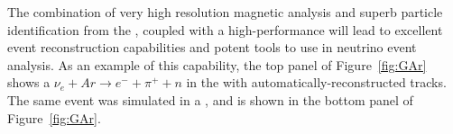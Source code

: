 The combination of very high resolution magnetic analysis and superb particle identification from the , coupled with a high-performance  will lead to excellent event reconstruction capabilities and potent tools to use in neutrino event analysis.  
As an example of this capability, the top panel of Figure~\ref{fig:GAr} shows a $\nu_e + Ar \xrightarrow{} e^- + \pi^+ +n$ in the  with automatically-reconstructed tracks.  The same event was simulated in a  , %
and is shown in the bottom panel of Figure~\ref{fig:GAr}.  
%
%

